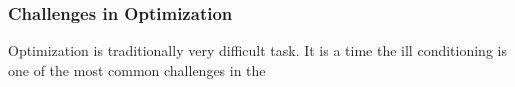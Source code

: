 \subsubsection{Challenges in Optimization}

Optimization is traditionally very difficult task. It is a time 
the ill conditioning is one of the most common challenges in the 